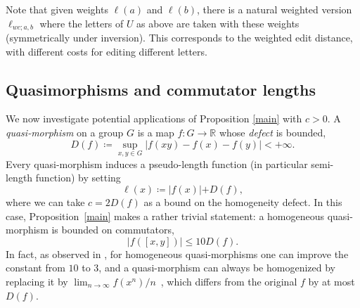 \documentclass[11pt,a4paper,reqno]{amsart}
\numberwithin{equation}{section}
\theoremstyle{plain}
\theoremstyle{definition}
\newcommand\R{\mathbb{R}}
\newcommand\normsymb{\ell}  %
\newcommand\norm[1]{\ell({#1})}   %
\begin{document}
{ Note that given weights $\normsymb(a)$ and $\normsymb(b)$,
there is a natural weighted version $\normsymb_{wc;a,b}$ where the
letters of $U$ as above are taken with these weights (symmetrically under
inversion). This corresponds to the weighted edit distance, with
different costs for editing different letters.}



\subsection{ Quasimorphisms and commutator lengths}

{ We now investigate potential applications of Proposition \ref{main} with $c > 0$.}
A \emph{quasi-morphism} on a group $G$ is a map $f : G \to \R$
whose \emph{defect} is bounded,
\[
	D(f) \coloneqq \sup_{x,y\in G} | f(xy) - f(x) - f(y) | < +\infty.
\]
{ Every quasi-morphism induces a pseudo-length function {(in particular semi-length function)}
by setting
\begin{equation}\label{quasimortonorm}
	\norm{ x } \coloneqq | f(x) | { + D(f),}
\end{equation}
where we can take $c = 2 D(f)$ as a bound on the homogeneity defect. In this case, Proposition~\ref{main} makes a rather
trivial statement: a homogeneous quasi-morphism is bounded on
commutators,
\[
	| f([x,y]) | \leq { 10} D(f).
\]
In fact, as observed in \cite[Lemme~1.1]{Br}, for homogeneous quasi-morphisms one can improve the
constant from $10$ to $3$, and a quasi-morphism can always be homogenized by replacing it by $\lim_{n \to \infty} f( x^n) / n$~\cite[p.~135]{Br}, which differs from the original $f$ by at most $D(f)$.}
\end{document}

